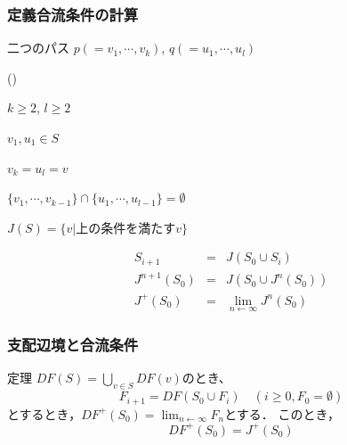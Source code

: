 \documentclass[ckj,dvipdfmx]{beamer}
\newcounter{coffee}
\begin{document}
\begin{frame}
  \frametitle{定義合流条件の計算}

  \begin{list}{}{}
    \item [定義合流条件($\mathscr{S}$)]
          二つのパス $p(=v_1,\cdots,v_k)$, $q(=u_1,\cdots,u_l)$
          \begin{list}{()}{}
            \item $k\ge 2$, $l\ge 2$
            \item $v_1,u_1\in S$
            \item $v_k=u_l=v$
            \item $\{v_1,\cdots,v_{k-1}\}\cap\{u_1,\cdots,u_{l-1}\}=\emptyset$
          \end{list}

          \vspace*{5pt}

    \item $J(S)=\{v|\mbox{上の条件を満たす$v$}\}$
  \end{list}

  \vspace*{5pt}


  \vspace*{5pt}

  {\small{}}

  \[
    \begin{array}{rcl}
      S_{i+1}      & = & J(S_0\cup S_i)                   \\
      J^{n+1}(S_0) & = & J(S_0\cup J^n(S_0))              \\
      J^+(S_0)     & = & \lim_{n\leftarrow\infty}J^n(S_0)
    \end{array}
  \]

\end{frame}

\begin{frame}
  \frametitle{支配辺境と合流条件}

  \begin{itembox}[l]{定理}
    $DF(S)=\bigcup_{v\in S}DF(v)$のとき、
    \[
      F_{i+1}=DF(S_0\cup F_i)\quad(i\ge 0,F_0=\emptyset)
    \]
    とするとき，$DF^+(S_0)=\lim_{n\leftarrow\infty}F_n$とする．
    このとき，
    \[
      DF^+(S_0)=J^+(S_0)
    \]
  \end{itembox}


\end{frame}
\end{document}
